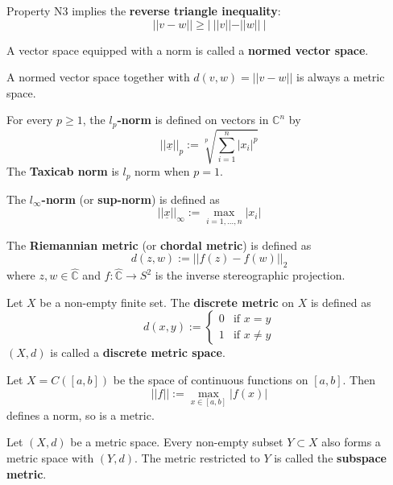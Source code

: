 \begin{definition}
	Property N3 implies the \textbf{reverse triangle inequality}:
	\[
		||v - w|| \ge | \ ||v|| - ||w|| \ |
	\]
\end{definition}

\begin{definition}
	A vector space equipped with a norm is called a \textbf{normed vector space}.
\end{definition}

\begin{remark}
	A normed vector space together with $d(v, w) = ||v - w||$ is always a metric space.
\end{remark}

\begin{example}
	For every $p \ge 1$, the \textbf{$l_p$-norm} is defined on vectors in $\mathbb{C}^n$ by
	\[
		||\underline{x}||_p := \sqrt[p]{\sum_{i = 1}^{n} |x_i|^p}
	\]
	The \textbf{Taxicab norm} is $l_p$ norm when $p = 1$.
\end{example}

\begin{example}
	The \textbf{$l_{\infty}$-norm} (or \textbf{sup-norm}) is defined as
	\[
		||\underline{x}||_{\infty} := \max_{i = 1, \dots, n} |x_i|
	\]
\end{example}

\begin{example}
	The \textbf{Riemannian metric} (or \textbf{chordal metric}) is defined as
	\[
		d(z, w) := ||f(z) - f(w)||_2
	\]
	where $z, w \in \hat{\mathbb{C}}$ and $f: \hat{\mathbb{C}} \rightarrow S^2$ is the inverse stereographic projection.
\end{example}

\begin{definition}
	Let $X$ be a non-empty finite set. The \textbf{discrete metric} on $X$ is defined as
	\[
		d(x, y) := \begin{cases}
			0 & \text{if } x = y \\
			1 & \text{if } x \ne y
		\end{cases}
	\]
	$(X, d)$ is called a \textbf{discrete metric space}.
\end{definition}

\begin{example}
	Let $X = C([a, b])$ be the space of continuous functions on $[a, b]$. Then
	\[
		||f|| := \max_{x \in [a, b]} |f(x)|
	\]
	defines a norm, so is a metric.
\end{example}

\begin{example}
	Let $(X, d)$ be a metric space. Every non-empty subset $Y \subset X$ also forms a metric space with $(Y, d)$. The metric restricted to $Y$ is called the \textbf{subspace metric}.
\end{example}

